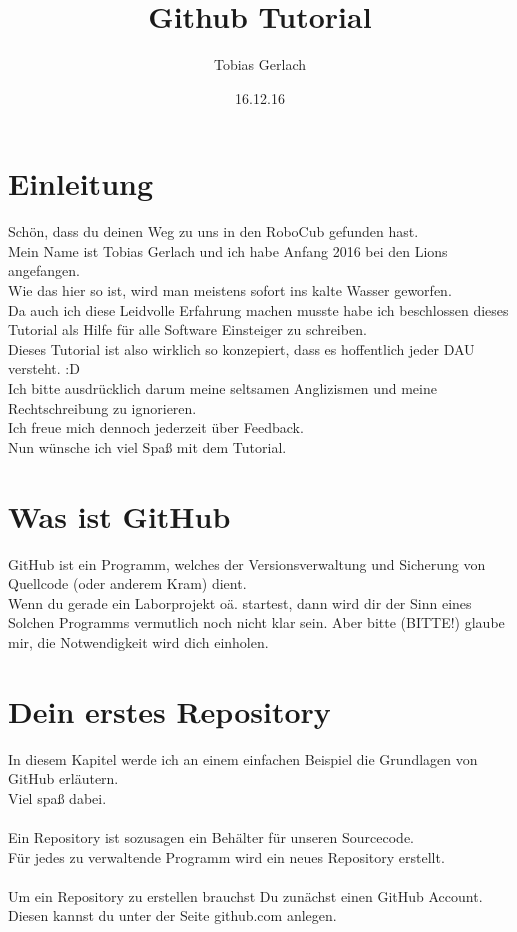 \documentclass[a4paper,10pt,DIV11,oneside]{scrartcl}
\title{Github Tutorial}
\author{Tobias Gerlach}
\date{16.12.16}
\begin{document}
\maketitle
\tableofcontents
\newpage

\section{Einleitung}
Schön, dass du deinen Weg zu uns in den RoboCub gefunden hast.\\
Mein Name ist Tobias Gerlach und ich habe Anfang 2016 bei den Lions angefangen.\\
Wie das hier so ist, wird man meistens sofort ins kalte Wasser geworfen.\\
Da auch ich diese Leidvolle Erfahrung machen musste habe ich beschlossen dieses Tutorial als Hilfe für alle Software Einsteiger zu schreiben.\\
Dieses Tutorial ist also wirklich so konzepiert, dass es hoffentlich jeder DAU versteht. :D\\
Ich bitte ausdrücklich darum meine seltsamen Anglizismen und meine Rechtschreibung zu ignorieren.\\
Ich freue mich dennoch jederzeit über Feedback.\\
Nun wünsche ich viel Spaß mit dem Tutorial.
\section{Was ist GitHub}
GitHub ist ein Programm, welches der Versionsverwaltung und Sicherung von Quellcode (oder anderem Kram) dient.\\
Wenn du gerade ein Laborprojekt oä. startest, dann wird dir der Sinn eines Solchen Programms vermutlich noch nicht klar sein. Aber bitte (BITTE!) glaube mir, die Notwendigkeit wird dich einholen.\\

\section{Dein erstes Repository}
In diesem Kapitel werde ich an einem einfachen Beispiel die Grundlagen von GitHub erläutern.\\
Viel spaß dabei.\\\\
Ein Repository ist sozusagen ein Behälter für unseren Sourcecode. \\
Für jedes zu verwaltende Programm wird ein neues Repository erstellt.\\\\
Um ein Repository zu erstellen brauchst Du zunächst einen GitHub Account.\\
Diesen kannst du unter der Seite github.com anlegen. \\
\end{document}
